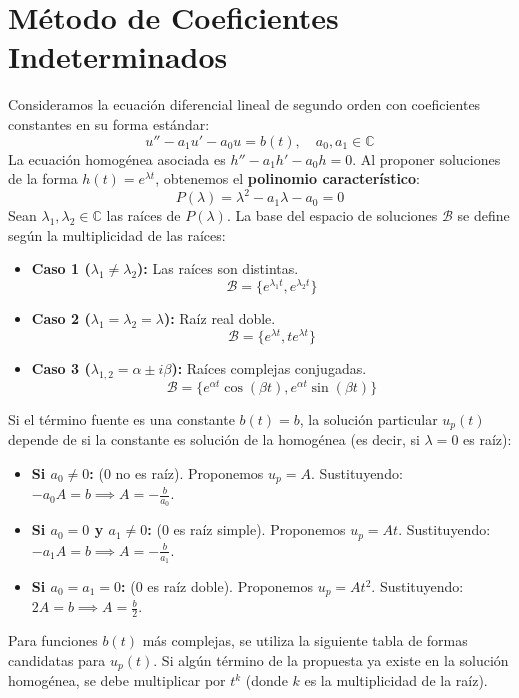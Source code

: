 ﻿\section{Método de Coeficientes Indeterminados}

Consideramos la ecuación diferencial lineal de segundo orden con coeficientes constantes en su forma estándar:
\[
    u'' - a_1 u' - a_0 u = b(t), \quad a_0, a_1 \in \mathbb{C} 
\]
La ecuación homogénea asociada es $h'' - a_1 h' - a_0 h = 0$. Al proponer soluciones de la forma $h(t) = e^{\lambda t}$, obtenemos el \textbf{polinomio característico}:
\[ P(\lambda) = \lambda^2 - a_1 \lambda - a_0 = 0 \]
Sean $\lambda_1, \lambda_2 \in \mathbb{C}$ las raíces de $P(\lambda)$. La base del espacio de soluciones $\mathcal{B}$ se define según la multiplicidad de las raíces:
\begin{itemize}
    \item \textbf{Caso 1 ($\lambda_1 \neq \lambda_2$):} Las raíces son distintas. 
    \[ \mathcal{B} = \{e^{\lambda_1 t}, e^{\lambda_2 t}\} \]
    \item \textbf{Caso 2 ($\lambda_1 = \lambda_2 = \lambda$):} Raíz real doble. 
    \[ \mathcal{B} = \{e^{\lambda t}, t e^{\lambda t}\} \]
    \item \textbf{Caso 3 ($\lambda_{1,2} = \alpha \pm i\beta$):} Raíces complejas conjugadas. 
    \[ \mathcal{B} = \{e^{\alpha t} \cos(\beta t), e^{\alpha t} \sin(\beta t)\} \]
\end{itemize}

Si el término fuente es una constante $b(t) = b$, la solución particular $u_p(t)$ depende de si la constante es solución de la homogénea (es decir, si $\lambda=0$ es raíz):

\begin{itemize}
    \item \textbf{Si $a_0 \neq 0$:} ($0$ no es raíz). Proponemos $u_p = A$. Sustituyendo: $-a_0 A = b \implies A = -\frac{b}{a_0}$.
    \item \textbf{Si $a_0 = 0$ y $a_1 \neq 0$:} ($0$ es raíz simple). Proponemos $u_p = At$. Sustituyendo: $-a_1 A = b \implies A = -\frac{b}{a_1}$.
    \item \textbf{Si $a_0 = a_1 = 0$:} ($0$ es raíz doble). Proponemos $u_p = At^2$. Sustituyendo: $2A = b \implies A = \frac{b}{2}$.
\end{itemize}

Para funciones $b(t)$ más complejas, se utiliza la siguiente tabla de formas candidatas para $u_p(t)$. Si algún término de la propuesta ya existe en la solución homogénea, se debe multiplicar por $t^k$ (donde $k$ es la multiplicidad de la raíz).

